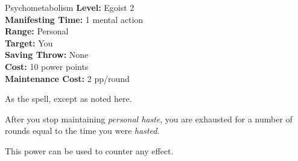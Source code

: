 {Psychometabolism}
{
	\textbf{Level:}
	Egoist 2\\
	\textbf{Manifesting Time:}
	1 mental action\\
	\textbf{Range:}
	Personal\\
	\textbf{Target:}
	You\\
	\textbf{Saving Throw:}
	None\\
	\textbf{Cost:}
	10 power points\\
	\textbf{Maintenance Cost:}
	2 pp/round\\
}
{
	As the  spell, except as noted here.

	After you stop maintaining \emph{personal haste}, you are exhausted for a number of rounds equal to the time you were \emph{hasted}.

	This power can be used to counter any  effect.
}